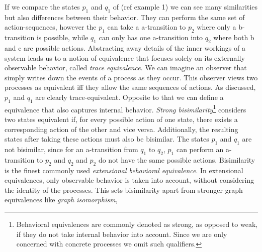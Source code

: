 \begin{isabellebody}
\begin{isamarkuptext}
\begin{center}
\end{center}%
\end{isamarkuptext}\isamarkuptrue%
%
\begin{isamarkuptext}%
If we compare the states $p_1$ and $q_1$ of (ref example 1) we can see many similarities but also differences between their behavior.
They can perform the same set of action-sequences, however the $p_1$ can take a a-transition to $p_2$ where only a b-transition is possible, 
while $q_1$ can only has one a-transition into $q_2$ where both b and c are possible actions.
Abstracting away details of the inner workings of a system leads us to a notion of equivalence that focuses solely on its externally observable behavior, called \textit{trace equivalence}. 
We can imagine an observer that simply writes down the events of a process as they occur. 
This observer views two processes as equivalent iff they allow the same sequences of actions. As discussed, $p_1$ and $q_1$ are clearly trace-equivalent.
Opposite to that we can define a equivalence that also captures internal behavior. \textit{Strong bisimilarity}\footnote{Behavioral equivalences are commonly denoted as strong, as opposed to weak, if they do not take internal behavior into account. Since we are only concerned with concrete processes we omit such qualifiers.} considers two states equivalent if, 
for every possible action of one state, there exists a corresponding action of the other and vice versa. 
Additionally, the resulting states after taking these actions must also be bisimilar. The states $p_1$ and $q_1$ are not bisimilar, since for an a-transition from $q_1$ to $q_2$, $p_1$ can perform an a-transition to $p_2$
and $q_2$ and $p_2$ do not have the same possible actions. Bisimilarity is the finest commonly used \textit{extensional behavioral equivalence}.
In extensional equivalences, only observable behavior is taken into account, without considering the
identity of the processes. This sets bisimilarity apart from stronger graph equivalences like \textit{graph isomorphism}, 

\end{isamarkuptext}
\end{isabellebody}
